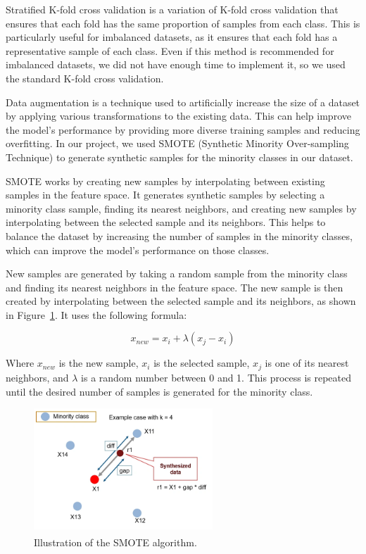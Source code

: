 \label{subsubsec:stratified_k_fold_cross_validation}

Stratified K-fold cross validation is a variation of K-fold cross validation that ensures that each fold has the same proportion of samples
from each class. This is particularly useful for imbalanced datasets, as it ensures that each fold has a representative sample of each class.
Even if this method is recommended for imbalanced datasets, we did not have enough time to implement it, so we used the standard K-fold cross
validation.

\label{subsubsec:smote}

Data augmentation is a technique used to artificially increase the size of a dataset by applying various transformations to the existing data.
This can help improve the model's performance by providing more diverse training samples and reducing overfitting. In our project, we used SMOTE
(Synthetic Minority Over-sampling Technique) to generate synthetic samples for the minority classes in our dataset.

SMOTE works by creating new samples by interpolating between existing samples in the feature space. It generates synthetic samples by selecting
a minority class sample, finding its nearest neighbors, and creating new samples by interpolating between the selected sample and its neighbors.
This helps to balance the dataset by increasing the number of samples in the minority classes, which can improve the model's performance on those
classes.

New samples are generated by taking a random sample from the minority class and finding its nearest neighbors in the feature space. The new sample
is then created by interpolating between the selected sample and its neighbors, as shown in Figure~\ref{fig:smote}. It uses the following formula:

\begin{equation}
	x_{new} = x_{i} + \lambda (x_{j} - x_{i})
\end{equation}

Where $x_{new}$ is the new sample, $x_{i}$ is the selected sample, $x_{j}$ is one of its nearest neighbors, and $\lambda$ is a random number
between 0 and 1. This process is repeated until the desired number of samples is generated for the minority class.

\begin{figure}[htbp!]
	\centering
	\includegraphics[width=0.6\textwidth]{../imgs/smote.png}
	\caption{Illustration of the SMOTE algorithm.\textsuperscript{\cite{analyticsvidhya-2020}}}
	\label{fig:smote}
\end{figure}